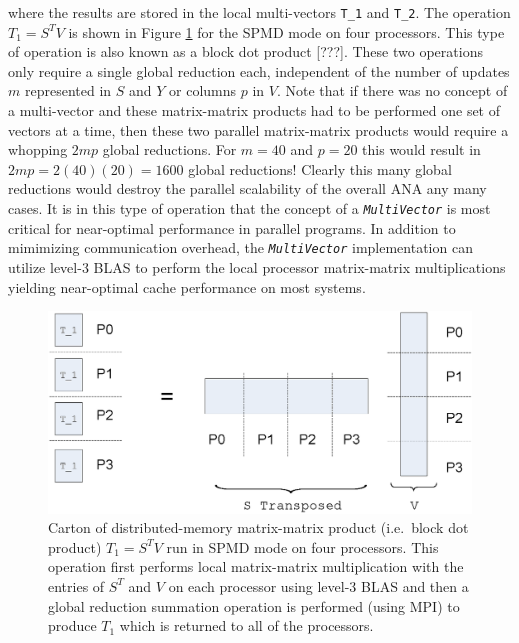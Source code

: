 {}\noindent{}where the results are stored in the local multi-vectors
{}\texttt{T\_1} and {}\texttt{T\_2}.  The operation $T_1 = S^T V$ is
shown in Figure {}\ref{tsfcore:fig:SPMD_Block_Dot_Prod_P4} for the
SPMD mode on four processors.  This type of operation is also known as
a block dot product [???].  These two operations only require a single
global reduction each, independent of the number of updates $m$
represented in $S$ and $Y$ or columns $p$ in $V$.  Note that if there
was no concept of a multi-vector and these matrix-matrix products had
to be performed one set of vectors at a time, then these two parallel
matrix-matrix products would require a whopping $2 m p$ global
reductions.  For $m = 40$ and $p = 20$ this would result in $2 m p =
2(40)(20) = 1600$ global reductions!  Clearly this many global
reductions would destroy the parallel scalability of the overall ANA
any many cases.  It is in this type of operation that the concept of a
{}\texttt{\textit{Multi\-Vector}} is most critical for near-optimal
performance in parallel programs.  In addition to mimimizing
communication overhead, the {}\texttt{\textit{Multi\-Vector}}
implementation can utilize level-3 BLAS to perform the local processor
matrix-matrix multiplications yielding near-optimal cache performance
on most systems.

{\bsinglespace
\begin{figure}
\begin{center}
\includegraphics*[angle=0,scale=0.60]{SPMD_Block_Dot_Prod_P4}
\end{center}
\caption{
\label{tsfcore:fig:SPMD_Block_Dot_Prod_P4}
Carton of distributed-memory matrix-matrix product (i.e.~block dot
product) $T_1 = S^T V$ run in SPMD mode on four processors.  This
operation first performs local matrix-matrix multiplication with the
entries of $S^T$ and $V$ on each processor using level-3 BLAS and then
a global reduction summation operation is performed (using MPI) to
produce $T_1$ which is returned to all of the processors.}
\end{figure}
\esinglespace}

